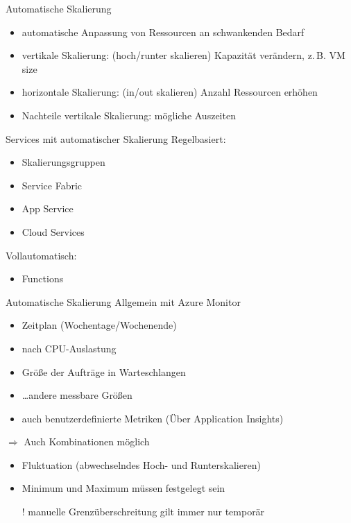 \begin{flashcard}[]{Automatische Skalierung}
  \begin{itemize}
    \item automatische Anpassung von Ressourcen an schwankenden Bedarf
    \item vertikale Skalierung: (hoch/runter skalieren)\newline
      Kapazität verändern, z.\,B. VM size
    \item horizontale Skalierung: (in/out skalieren)\newline
      Anzahl Ressourcen erhöhen
    \item Nachteile vertikale Skalierung: mögliche Auszeiten
  \end{itemize}
\end{flashcard}

\begin{flashcard}[]{Services mit automatischer Skalierung}
  Regelbasiert:
  \begin{itemize}
    \item Skalierungsgruppen
    \item Service Fabric
    \item App Service
    \item Cloud Services
  \end{itemize}
  Vollautomatisch:
  \begin{itemize}
    \item Functions
  \end{itemize}
\end{flashcard}

\begin{flashcard}[]{Automatische Skalierung}
  Allgemein mit Azure Monitor
  \begin{itemize}
    \item Zeitplan (Wochentage/Wochenende)
    \item nach CPU-Auslastung
    \item Größe der Aufträge in Warteschlangen
    \item \ldots andere messbare Größen
    \item auch benutzerdefinierte Metriken (Über Application Insights)
  \end{itemize}
  $\Rightarrow$ Auch Kombinationen möglich
  \begin{itemize}
    \item Fluktuation (abwechselndes Hoch- und Runterskalieren)
    \item Minimum und Maximum müssen festgelegt sein
    \item[!] manuelle Grenzüberschreitung gilt immer nur temporär
  \end{itemize}
  
\end{flashcard}

